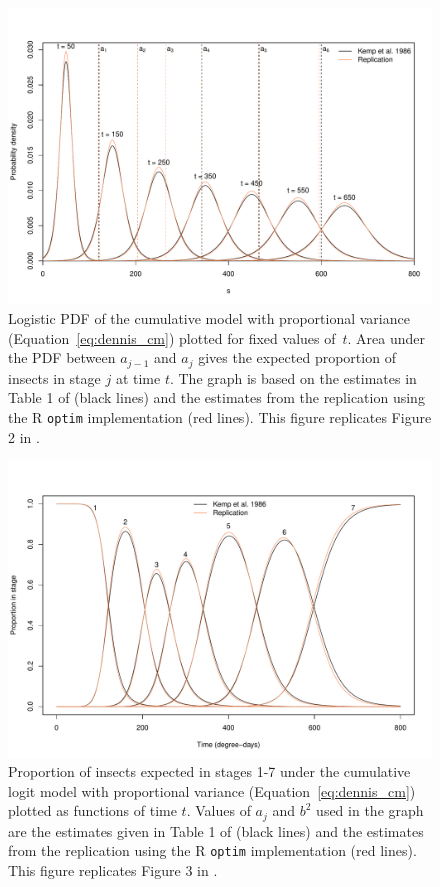 \begin{figure}[p]
  \centering
  \includegraphics[width=\textwidth]{../figures/fig1_dennis_fig2.pdf}
  \caption{Logistic PDF of the cumulative model with proportional variance (Equation~\ref{eq:dennis_cm}) plotted for fixed values of~$t$. 
  Area under the PDF between $a_{j-1}$ and $a_j$ gives the expected proportion of insects in stage $j$ at time $t$. 
  The graph is based on the estimates in Table 1 of \citep{kemp1986stochastic} (black lines) and the estimates from the replication using the R \texttt{optim} implementation (red lines). 
  This figure replicates Figure 2 in \citep{dennis1986stochastic}.}
  \label{fig:fig1}
\end{figure}


\begin{figure}[p]
  \centering
  \includegraphics[width=\textwidth]{../figures/fig2_dennis_fig3.pdf}
  \caption{Proportion of insects expected in stages 1-7 under the cumulative logit model with proportional variance (Equation~\ref{eq:dennis_cm}) plotted as functions of time $t$.
   Values of $a_j$ and $b^2$ used in the graph are the estimates given in Table 1 of \citep{kemp1986stochastic} (black lines) and the estimates from the replication using the R \texttt{optim} implementation (red lines). 
   This figure replicates Figure 3 in \citep{dennis1986stochastic}.}
  \label{fig:fig2}
\end{figure} 

